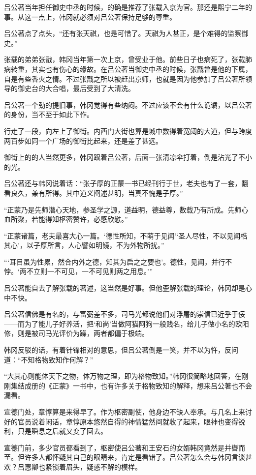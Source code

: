 吕公著当年担任御史中丞的时候，的确是推荐了张载入京为官。那还是熙宁二年的事。从这一点上，韩冈就必须对吕公著保持足够的尊重。

吕公著点了点头，“还有张天祺，也是可惜了。天祺为人甚正，是个难得的监察御史。”

张载的弟弟张戬，韩冈当年第一次上京，曾受业于他。前些日子也病死了，张载肺病转重，其实也有伤心的缘故。在吕公著当御史中丞的时候，张戬曾是他的下属，自是有些香火之情。不过张戬之所以被赶出京师，也就是因为他参加了吕公著所领导的御史台的大合唱，最后受到了大清洗。

吕公著一个劲的提旧事，韩冈觉得有些纳闷。不过应该不会有什么诡谲，以吕公著的身份，当不至于如此下作。

行走了一段，向左上了御街。内西门大街也算是城中数得着宽阔的大道，但与跨度两百步如同一个广场的御街比起来，还是差了甚远。

御街上的的人当然更多，韩冈跟着吕公著，后面一张清凉伞打着，倒是沾光了不小的光。

吕公著还与韩冈说着话：“张子厚的正蒙一书已经刊行于世，老夫也有了一套，翻看良久，兼有所得。其中道义阐述甚明，当真不愧是子厚。”

“正蒙乃是先师潜心天地，参圣学之源，道益明，德益尊，数载乃有所成。先师心血所聚，若能得知枢密赞许，必感欣慰。”

“正蒙诸篇，老夫最喜大心一篇。‘德性所知，不萌于见闻’‘圣人尽性，不以见闻梏其心’，以子厚所言，人心譬如明镜，不为外物所扰。”

“‘耳目虽为性累，然合内外之德，知其为启之之要也’。德性，见闻，并行不悖。‘两不立则一不可见，一不可见则两之用息。’”

吕公著能自去了解张载的著述，这当然是好事。但他歪解张载的理论，韩冈却是心中不快。

吕公著信佛是有名的，与富弼差不多，司马光都说他们对浮屠的崇信已近乎于佞——而为了能儿子好养活，把‘和尚’当做阿猫阿狗一般贱名，给儿子做小名的欧阳修，则是被司马光评价为躁，两者都偏于极端。

韩冈反驳的话，有着针锋相对的意思，但吕公著倒是一笑，并不以为忤，反问道：“不知格物致知作何解？”

“大其心则能体天下之物，体万物之理，即为格物致知。”韩冈很简略地回答，在刚刚集结成册的《正蒙》一书中，也有许多关于格物致知的解释，想来吕公著也不会漏看。

宣德门处，章惇算是来得早了。作为枢密副使，他身边不缺人奉承。与几名上来讨好的官员说着闲话，章惇原本悠然自得的神情猛然间就收了起来，眼神也变得锐利，只是瞬息之后就又变了回去。

宣德门前，多少官员都看到了，枢密使吕公著和王安石的女婿韩冈竟然是并辔而至。但许多人都怀疑其自己的眼睛来，肯定是看错了。吕公著怎么会与韩冈言谈甚欢？吕惠卿也紧锁着眉头，疑惑不解的模样。

